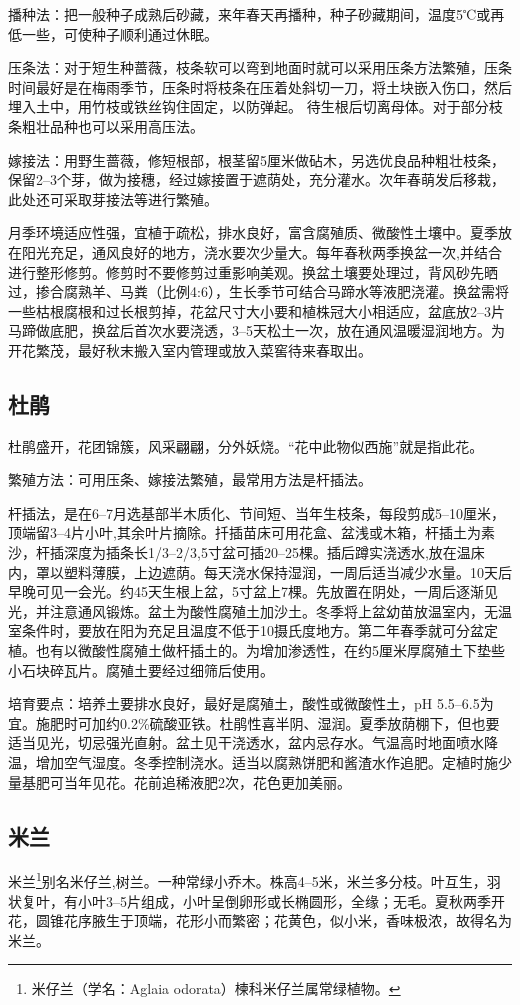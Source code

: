 \documentclass{ctexbook}
\begin{document}
播种法：把一般种子成熟后砂藏，来年春天再播种，种子砂藏期间，温度5℃或再低一些，可使种子顺利通过休眠。

压条法：对于短生种蔷薇，枝条软可以弯到地面时就可以采用压条方法繁殖，压条时间最好是在梅雨季节，压条时将枝条在压着处斜切一刀，将土块嵌入伤口，然后埋入土中，用竹枝或铁丝钩住固定，以防弹起。
待生根后切离母体。对于部分枝条粗壮品种也可以采用高压法。

嫁接法：用野生蔷薇，修短根部，根茎留5厘米做砧木，另选优良品种粗壮枝条，保留2--3个芽，做为接穗，经过嫁接置于遮荫处，充分灌水。次年春萌发后移栽，此处还可采取芽接法等进行繁殖。

月季环境适应性强，宜植于疏松，排水良好，富含腐殖质、微酸性土壤中。夏季放在阳光充足，通风良好的地方，浇水要次少量大。每年春秋两季换盆一次,并结合进行整形修剪。修剪时不要修剪过重影响美观。换盆土壤要处理过，背风砂先晒过，掺合腐熟羊、马粪（比例4:6），生长季节可结合马蹄水等液肥浇灌。换盆需将一些枯根腐根和过长根剪掉，花盆尺寸大小要和植株冠大小相适应，盆底放2--3片马蹄做底肥，换盆后首次水要浇透，3--5天松土一次，放在通风温暖湿润地方。为开花繁茂，最好秋末搬入室内管理或放入菜窖待来春取出。

\subsection{杜鹃}
杜鹃盛开，花团锦簇，风采翩翩，分外妖烧。“花中此物似西施”就是指此花。

繁殖方法：可用压条、嫁接法繁殖，最常用方法是杆插法。

杆插法，是在6--7月选基部半木质化、节间短、当年生枝条，每段剪成5--10厘米，顶端留3--4片小叶,其余叶片摘除。扦插苗床可用花盒、盆浅或木箱，杆插土为素沙，杆插深度为插条长1/3--2/3,5寸盆可插20--25棵。插后蹲实浇透水,放在温床内，罩以塑料薄膜，上边遮荫。每天浇水保持湿润，一周后适当减少水量。10天后早晚可见一会光。约45天生根上盆，5寸盆上7棵。先放置在阴处，一周后逐渐见光，并注意通风锻炼。盆土为酸性腐殖土加沙土。冬季将上盆幼苗放温室内，无温室条件时，要放在阳为充足且温度不低于10摄氏度地方。第二年春季就可分盆定植。也有以微酸性腐殖土做杆插土的。为增加渗透性，在约5厘米厚腐殖土下垫些小石块碎瓦片。腐殖土要经过细筛后使用。

培育要点：培养土要排水良好，最好是腐殖土，酸性或微酸性土，pH 5.5--6.5为宜。施肥时可加约0.2\%硫酸亚铁。杜鹃性喜半阴、湿润。夏季放荫棚下，但也要适当见光，切忌强光直射。盆土见干浇透水，盆内忌存水。气温高时地面喷水降温，增加空气湿度。冬季控制浇水。适当以腐熟饼肥和酱渣水作追肥。定植时施少量基肥可当年见花。花前追稀液肥2次，花色更加美丽。
\subsection{米兰}
米兰\footnote{米仔兰（学名：Aglaia odorata）楝科米仔兰属常绿植物。}别名米仔兰,树兰。一种常绿小乔木。株高4--5米，米兰多分枝。叶互生，羽状复叶，有小叶3--5片组成，小叶呈倒卵形或长椭圆形，全缘；无毛。夏秋两季开花，圆锥花序腋生于顶端，花形小而繁密；花黄色，似小米，香味极浓，故得名为米兰。
\end{document}
